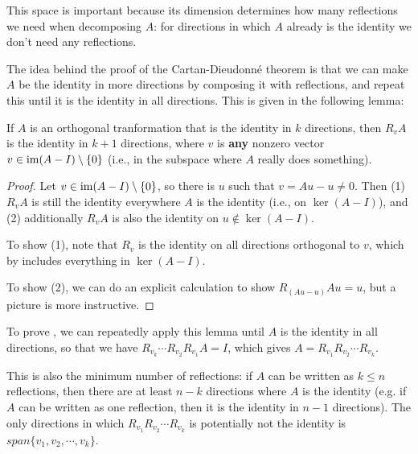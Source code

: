 This space is important because its dimension determines how many reflections we need when decomposing $A$: for directions in which $A$ already is the identity we don't need any reflections.

The idea behind the proof of the Cartan-Dieudonné theorem is that we can make $A$ be the identity in more directions by composing it with reflections, and repeat this until it is the identity in all directions.
This is given in the following lemma:

\begin{lemma}
  If $A$ is an orthogonal tranformation that is the identity in $k$ directions, then $R_v A$ is the identity in $k+1$ directions, where $v$ is \textbf{any} nonzero vector $v \in \operatorname{im}(A - I) \setminus \{ 0 \}$ (i.e., in the subspace where $A$ really does something).
\end{lemma}
\begin{proof}
  Let $v \in \operatorname{im}(A-I) \setminus \{ 0 \}$, so there is $u$ such that $v = Au - u \neq 0$.
  Then (1) $R_v A$ is still the identity everywhere $A$ is the identity (i.e., on $\ker(A - I)$), and (2) additionally $R_v A$ is also the identity on $u \notin \ker(A - I)$.

  To show (1), note that $R_v$ is the identity on all directions orthogonal to $v$, which by  includes everything in $\ker(A - I)$.

  To show (2), we can do an explicit calculation to show $R_{(Au - u)}Au = u$, but a picture is more instructive.
\end{proof}

To prove , we can repeatedly apply this lemma until $A$ is the identity in all directions, so that we have $R_{v_k} \cdots R_{v_2} R_{v_1} A = I$, which gives $A = R_{v_1} R_{v_2} \cdots R_{v_k}$.

This is also the minimum number of reflections: if $A$ can be written as $k \leq n$ reflections, then there are at least $n - k$ directions where $A$ is the identity (e.g. if $A$ can be written as one reflection, then it is the identity in $n - 1$ directions).
The only directions in which $R_{v_1} R_{v_2} \cdots R_{v_k}$ is potentially not the identity is $span \{v_1, v_2, \cdots, v_k\}$.



% 
% 


